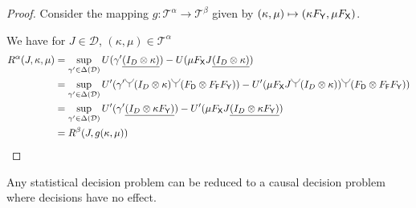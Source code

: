 \begin{proof}
Consider the mapping $g:\mathscr{T}^\alpha\to\mathscr{T}^\beta$ given by $(\kappa,\mu)\mapsto (\kappa F_{\mathsf{Y}},\mu F_{\mathsf{X}})$.

We have for $J\in \mathscr{D}$, $(\kappa,\mu)\in\mathscr{T}^\alpha$
\begin{align}
    R^\alpha(J,\kappa,\mu) &= \sup_{\gamma'\in\Delta(\mathcal{D})} U(\gamma'\underline{(I_D\otimes\kappa)}) - U(\mu F_{\RV{X}} J\underline{(I_D\otimes\kappa)})\\
                           &= \sup_{\gamma'\in\Delta(\mathcal{D})} U'(\gamma'\splitter{0.15}(I_D\otimes\kappa)\splitter{0.15}(F_{\RV{D}}\otimes F_{\RV{F}} F_{\RV{Y}})) - U'(\mu F_{\RV{X}} J\splitter{0.15} (I_D\otimes\kappa))\splitter{0.15}(F_{\RV{D}}\otimes F_{\RV{F}} F_{\RV{Y}}))\\
                           &= \sup_{\gamma'\in\Delta(\mathcal{D})} U'(\gamma'\underline{(I_D\otimes \kappa F_{\RV{Y}})}) - U'(\mu F_{\RV{X}} J\underline{(I_D\otimes \kappa F_{\RV{Y}})})\\
                           &= R^\beta (J,g(\kappa,\mu))
\end{align}
\end{proof}

Any statistical decision problem can be reduced to a causal decision problem where decisions have no effect.


